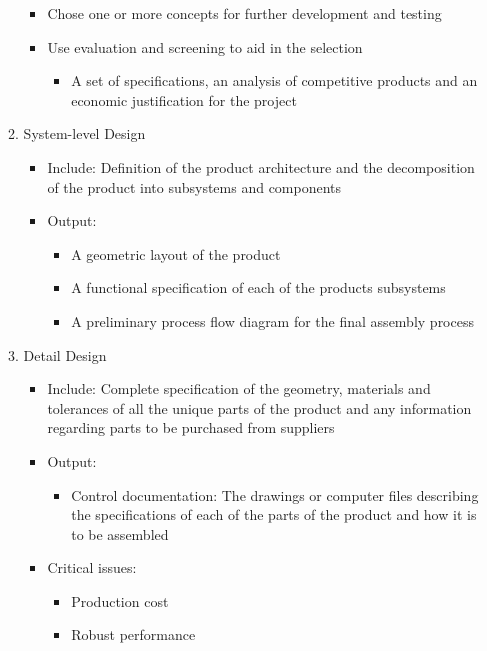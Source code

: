 \documentclass[openany,12pt,a4paper]{book}
\begin{document}
\begin{itemize}
\begin{enumerate}
\begin{itemize}
            \item Chose one or more concepts for further development and testing
            \item Use evaluation and screening to aid in the selection
            \begin{itemize}
                \item A set of specifications, an analysis of competitive products and an economic justification for the project
            \end{itemize}
        \end{itemize}
        \item System-level Design
        \begin{itemize}
            \item Include: Definition of the product architecture and the decomposition of the product into subsystems and components
            \item Output:
            \begin{itemize}
                \item A geometric layout of the product
                \item A functional specification of each of the products subsystems
                \item A preliminary process flow diagram for the final assembly process
            \end{itemize}
        \end{itemize}
        \item Detail Design
        \begin{itemize}
            \item Include: Complete specification of the geometry, materials and tolerances of all the unique parts of the product and any information regarding parts to be purchased from suppliers
            \item Output:
            \begin{itemize}
                \item Control documentation: The drawings or computer files describing the specifications of each of the parts of the product and how it is to be assembled
            \end{itemize}
            \item Critical issues:
            \begin{itemize}
                \item Production cost
                \item Robust performance

\end{itemize}
\end{itemize}
\end{enumerate}
\end{itemize}
\end{document}
